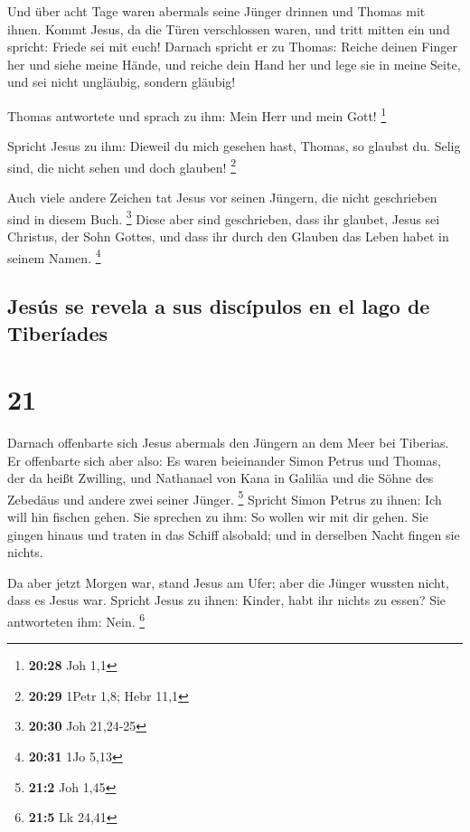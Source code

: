  Und über acht Tage waren abermals seine Jünger drinnen
und Thomas mit ihnen. Kommt Jesus, da die Türen verschlossen waren, und
tritt mitten ein und spricht: Friede sei mit euch! 
Darnach spricht er zu Thomas: Reiche deinen Finger her und siehe meine
Hände, und reiche dein Hand her und lege sie in meine Seite, und sei
nicht ungläubig, sondern gläubig!

 Thomas antwortete und sprach zu ihm: Mein Herr und mein
Gott! \footnote{\textbf{20:28} Joh 1,1}

 Spricht Jesus zu ihm: Dieweil du mich gesehen hast,
Thomas, so glaubst du. Selig sind, die nicht sehen und doch glauben!
\footnote{\textbf{20:29} 1Petr 1,8; Hebr 11,1}

 Auch viele andere Zeichen tat Jesus vor seinen Jüngern,
die nicht geschrieben sind in diesem Buch. \footnote{\textbf{20:30} Joh
  21,24-25}  Diese aber sind geschrieben, dass ihr
glaubet, Jesus sei Christus, der Sohn Gottes, und dass ihr durch den
Glauben das Leben habet in seinem Namen. \footnote{\textbf{20:31} 1Jo
  5,13}

\hypertarget{jesuxfas-se-revela-a-sus-discuxedpulos-en-el-lago-de-tiberuxedades}{%
\subsection{Jesús se revela a sus discípulos en el lago de
Tiberíades}\label{jesuxfas-se-revela-a-sus-discuxedpulos-en-el-lago-de-tiberuxedades}}

\hypertarget{section-20}{%
\section{21}\label{section-20}}

 Darnach offenbarte sich Jesus abermals den Jüngern an dem
Meer bei Tiberias. Er offenbarte sich aber also:  Es waren
beieinander Simon Petrus und Thomas, der da heißt Zwilling, und
Nathanael von Kana in Galiläa und die Söhne des Zebedäus und andere zwei
seiner Jünger. \footnote{\textbf{21:2} Joh 1,45}  Spricht
Simon Petrus zu ihnen: Ich will hin fischen gehen. Sie sprechen zu ihm:
So wollen wir mit dir gehen. Sie gingen hinaus und traten in das Schiff
alsobald; und in derselben Nacht fingen sie nichts.

 Da aber jetzt Morgen war, stand Jesus am Ufer; aber die
Jünger wussten nicht, dass es Jesus war.  Spricht Jesus zu
ihnen: Kinder, habt ihr nichts zu essen? Sie antworteten ihm: Nein.
\footnote{\textbf{21:5} Lk 24,41}

